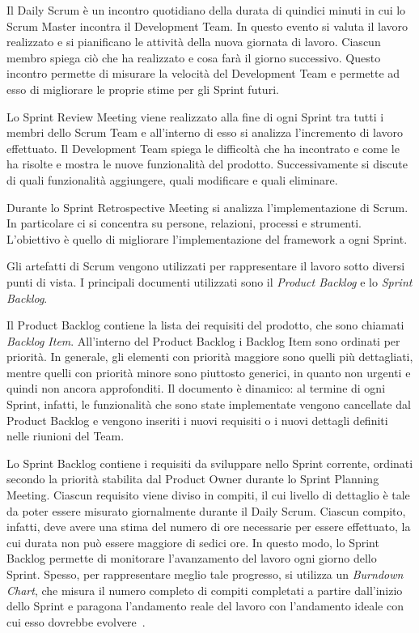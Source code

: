 			Il Daily Scrum è un incontro quotidiano della durata di quindici minuti in cui lo Scrum Master incontra il Development Team. 
			In questo evento si valuta il lavoro realizzato e si pianificano le attività della nuova giornata di lavoro.
			Ciascun membro spiega ciò che ha realizzato e cosa farà il giorno successivo.
			Questo incontro permette di misurare la velocità del Development Team e permette ad esso di migliorare le proprie stime per gli Sprint futuri.
			
			Lo Sprint Review Meeting viene realizzato alla fine di ogni Sprint tra tutti i membri dello Scrum Team e all'interno di esso si analizza l'incremento di lavoro effettuato.
			Il Development Team spiega le difficoltà che ha incontrato e come le ha risolte e mostra le nuove funzionalità del prodotto.
			Successivamente si discute di quali funzionalità aggiungere, quali modificare e quali eliminare.

			Durante lo Sprint Retrospective Meeting si analizza l'implementazione di Scrum. 
			In particolare ci si concentra su persone, relazioni, processi e strumenti.
			L'obiettivo è quello di migliorare l'implementazione del framework a ogni Sprint.

			Gli artefatti di Scrum vengono utilizzati per rappresentare il lavoro sotto diversi punti di vista.
			I principali documenti utilizzati sono il \emph{Product Backlog} e lo \emph{Sprint Backlog}.
			
			Il Product Backlog contiene la lista dei requisiti del prodotto, che sono chiamati \emph{Backlog Item}.
			All'interno del Product Backlog i Backlog Item sono ordinati per priorità.
			In generale, gli elementi con priorità maggiore sono quelli più dettagliati, mentre quelli con priorità minore sono  piuttosto generici, in quanto non urgenti e quindi non ancora approfonditi.
			Il documento è dinamico: al termine di ogni Sprint, infatti, le funzionalità che sono state implementate vengono cancellate dal Product Backlog e vengono inseriti i nuovi requisiti o i nuovi dettagli definiti nelle riunioni del Team.

			Lo Sprint Backlog contiene i requisiti da sviluppare nello Sprint corrente, ordinati secondo la priorità stabilita dal Product Owner durante lo Sprint Planning Meeting.
			Ciascun requisito viene diviso in compiti, il cui livello di dettaglio è tale da poter essere misurato giornalmente durante il Daily Scrum.
			Ciascun compito, infatti, deve avere una stima del numero di ore necessarie per essere effettuato, la cui durata non può essere maggiore di sedici ore.
			In questo modo, lo Sprint Backlog permette di monitorare l'avanzamento del lavoro ogni giorno dello Sprint.
			Spesso, per rappresentare meglio tale progresso, si utilizza un \emph{Burndown Chart}, che misura il numero completo di compiti completati a partire dall'inizio dello Sprint e paragona l'andamento reale del lavoro con l'andamento ideale con cui esso dovrebbe evolvere~\cite{scrumEnglishGuide}.

